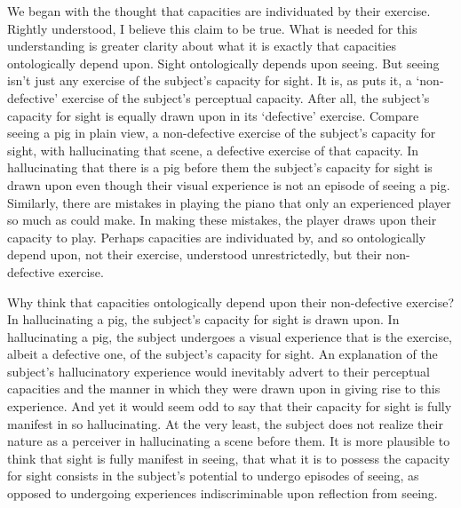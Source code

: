 \documentclass[12pt]{article}
\begin{document}
We began with the thought that capacities are individuated by their exercise. Rightly understood, I believe this claim to be true. What is needed for this understanding is greater clarity about what it is exactly that capacities ontologically depend upon. Sight ontologically depends upon seeing. But seeing isn't just any exercise of the subject's capacity for sight. It is, as \citet{McDowell:2010fk} puts it, a `non-defective' exercise of the subject's perceptual capacity. After all, the subject's capacity for sight is equally drawn upon in its `defective' exercise. Compare seeing a pig in plain view, a non-defective exercise of the subject's capacity for sight, with hallucinating that scene, a defective exercise of that capacity. In hallucinating that there is a pig before them the subject's capacity for sight is drawn upon even though their visual experience is not an episode of seeing a pig. Similarly, there are mistakes in playing the piano that only an experienced player so much as could make. In making these mistakes, the player draws upon their capacity to play. Perhaps capacities are individuated by, and so ontologically depend upon, not their exercise, understood unrestrictedly, but their non-defective exercise.

Why think that capacities ontologically depend upon their non-defective exercise? In hallucinating a pig, the subject's capacity for sight is drawn upon. In hallucinating a pig, the subject undergoes a visual experience that is the exercise, albeit a defective one, of the subject's capacity for sight. An explanation of the subject's hallucinatory experience would inevitably advert to their perceptual capacities and the manner in which they were drawn upon in giving rise to this experience. And yet it would seem odd to say that their capacity for sight is fully manifest in so hallucinating. At the very least, the subject does not realize their nature as a perceiver in hallucinating a scene before them. It is more plausible to think that sight is fully manifest in seeing, that what it is to possess the capacity for sight consists in the subject's potential to undergo episodes of seeing, as opposed to undergoing experiences indiscriminable upon reflection from seeing.
\end{document}
